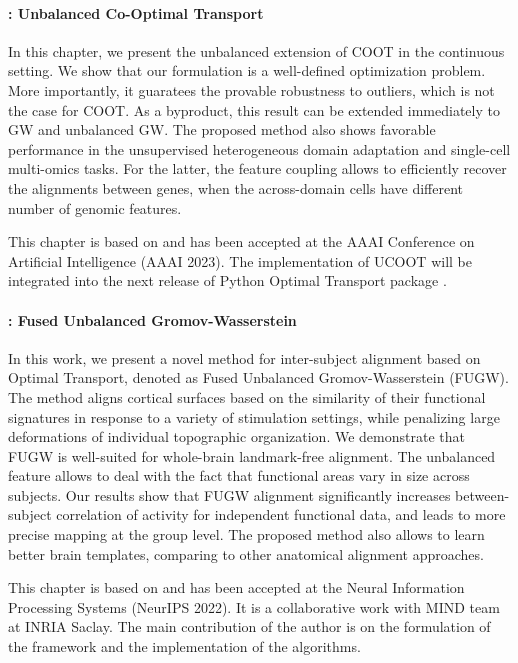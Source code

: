 \paragraph{: Unbalanced Co-Optimal Transport}

In this chapter, we present the unbalanced extension of COOT in the
continuous setting. We show that our formulation is a well-defined optimization problem.
More importantly, it guaratees the provable robustness to outliers,
which is not the case for COOT. As a byproduct, this result can be
extended immediately to GW and unbalanced GW. The proposed method also shows favorable performance in
the unsupervised heterogeneous domain adaptation and single-cell multi-omics tasks.
For the latter, the feature coupling allows to efficiently recover
the alignments between genes, when the across-domain cells have different number of genomic features.

This chapter is based on \citep{Tran23} and has been accepted at the
AAAI Conference on Artificial Intelligence (AAAI 2023). The implementation of UCOOT will be
integrated into the next release of Python Optimal Transport package \citep{Flamary21}.

\paragraph{: Fused Unbalanced Gromov-Wasserstein}

In this work, we present a novel method for inter-subject alignment based on Optimal Transport,
denoted as Fused Unbalanced Gromov-Wasserstein (FUGW). The method aligns cortical surfaces based
on the similarity of their functional signatures in response to a variety of stimulation settings,
while penalizing large deformations of individual topographic organization. We demonstrate that
FUGW is well-suited for whole-brain landmark-free alignment. The unbalanced feature allows
to deal with the fact that functional areas vary in size across subjects. Our results show that
FUGW alignment significantly increases between-subject correlation of activity for independent
functional data, and leads to more precise mapping at the group level.
The proposed method also allows to learn better brain templates, comparing to other anatomical
alignment approaches.

This chapter is based on \citep{Thual22} and has been accepted at the
Neural Information Processing Systems (NeurIPS 2022).
It is a collaborative work with MIND team at INRIA Saclay.
The main contribution of the author is on the formulation of the framework
and the implementation of the algorithms.

